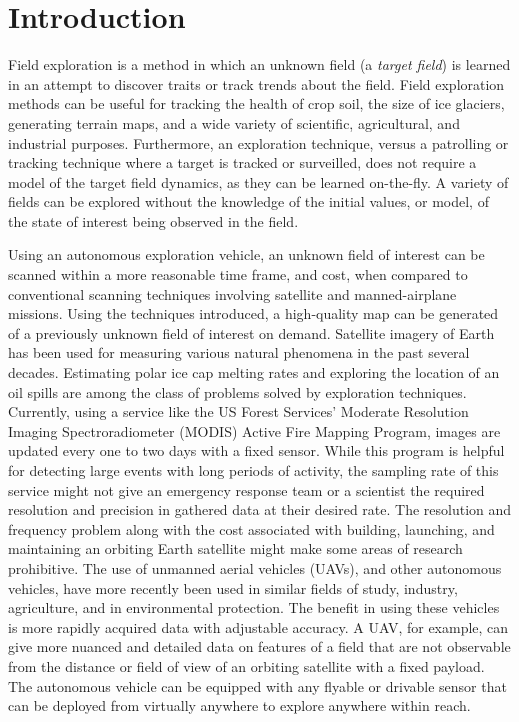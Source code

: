 
\chapter{Introduction}
Field exploration is a method in which an unknown field (a \textit{target field}) is learned in an attempt to discover traits or track trends about the field. Field exploration methods can be useful for tracking the health of crop soil, the size of ice glaciers, generating terrain maps, and a wide variety of scientific, agricultural, and industrial purposes. Furthermore, an exploration technique, versus a patrolling or tracking technique where a target is tracked or surveilled, does not require a model of the target field dynamics, as they can be learned on-the-fly. A variety of fields can be explored without the knowledge of the initial values, or model, of the state of interest being observed in the field.

Using an autonomous exploration vehicle, an unknown field of interest can be scanned within a more reasonable time frame, and cost, when compared to conventional scanning techniques involving satellite and manned-airplane missions. Using the techniques introduced, a high-quality map can be generated of a previously unknown field of interest on demand. Satellite imagery of Earth has been used for measuring various natural phenomena in the past several decades. Estimating polar ice cap melting rates and exploring the location of an oil spills are among the class of problems solved by exploration techniques. Currently, using a service like the US Forest Services' Moderate Resolution Imaging Spectroradiometer (MODIS) Active Fire Mapping Program, images are updated every one to two days with a fixed sensor. While this program is helpful for detecting large events with long periods of activity, the sampling rate of this service might not give an emergency response team or a scientist the required resolution and precision in gathered data at their desired rate. The resolution and frequency problem along with the cost associated with building, launching, and maintaining an orbiting Earth satellite might make some areas of research prohibitive. The use of unmanned aerial vehicles (UAVs), and other autonomous vehicles, have more recently been used in similar fields of study, industry, agriculture, and in environmental protection. The benefit in using these vehicles is more rapidly acquired data with adjustable accuracy. A UAV, for example, can give more nuanced and detailed data on features of a field that are not observable from the distance or field of view of an orbiting satellite with a fixed payload. The autonomous vehicle can be equipped with any flyable or drivable sensor that can be deployed from virtually anywhere to explore anywhere within reach.

